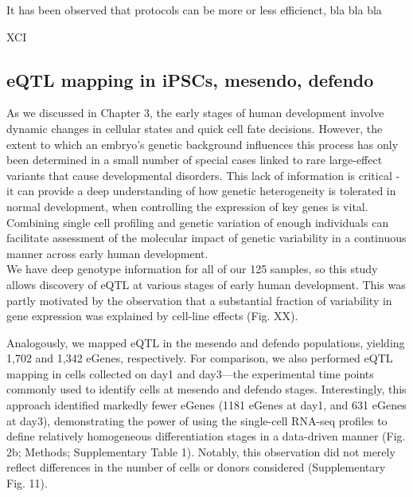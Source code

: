 It has been observed that protocols can be more or less efficienct, bla bla bla

XCI




\subsection{eQTL mapping in iPSCs, mesendo, defendo}

As we discussed in Chapter 3, the early stages of human development involve dynamic changes in cellular states and quick cell fate decisions. 
However, the extent to which an embryo’s genetic background influences this process has only been determined in a small number of special cases linked to rare large-effect variants that cause developmental disorders. 
This lack of information is critical - it can provide a deep understanding of how genetic heterogeneity is tolerated in normal development, when controlling the expression of key genes is vital. 
Combining single cell profiling and genetic variation of enough individuals can facilitate assessment of the molecular impact of genetic variability in a continuous manner across early human development.\\
 
We have deep genotype information for all of our 125 samples, so this study allows discovery of eQTL at various stages of early human development. 
This was partly motivated by the observation that a substantial fraction of variability in gene expression was explained by cell-line effects (Fig. XX).

Analogously, we mapped eQTL in the mesendo and defendo populations, yielding 1,702 and 1,342 eGenes, respectively. 
For comparison, we also performed eQTL mapping in cells collected on day1 and day3—the experimental time points commonly used to identify cells at mesendo and defendo stages.
Interestingly, this approach identified markedly fewer eGenes (1181 eGenes at day1, and 631 eGenes at day3), demonstrating the power of using the single-cell RNA-seq profiles to define relatively homogeneous differentiation stages in a data-driven manner (Fig. 2b; Methods; Supplementary Table 1). 
Notably, this observation did not merely reflect differences in the number of cells or donors considered (Supplementary Fig. 11).\\

